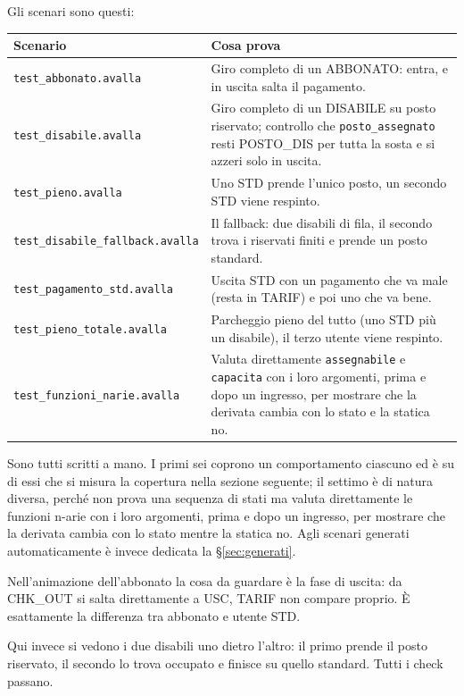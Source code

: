 Gli scenari sono questi:

\begin{longtable}{@{}p{6cm}p{8.8cm}@{}}
\toprule
\textbf{Scenario} & \textbf{Cosa prova} \\
\midrule
\endhead
\texttt{test\_abbonato.avalla} & Giro completo di un ABBONATO: entra, e in uscita salta il pagamento. \\
\texttt{test\_disabile.avalla} & Giro completo di un DISABILE su posto riservato; controllo che \texttt{posto\_assegnato} resti POSTO\_DIS per tutta la sosta e si azzeri solo in uscita. \\
\texttt{test\_pieno.avalla} & Uno STD prende l'unico posto, un secondo STD viene respinto. \\
\texttt{test\_disabile\_fallback.avalla} & Il fallback: due disabili di fila, il secondo trova i riservati finiti e prende un posto standard. \\
\texttt{test\_pagamento\_std.avalla} & Uscita STD con un pagamento che va male (resta in TARIF) e poi uno che va bene. \\
\texttt{test\_pieno\_totale.avalla} & Parcheggio pieno del tutto (uno STD più un disabile), il terzo utente viene respinto. \\
\texttt{test\_funzioni\_narie.avalla} & Valuta direttamente \texttt{assegnabile} e \texttt{capacita} con i loro argomenti, prima e dopo un ingresso, per mostrare che la derivata cambia con lo stato e la statica no. \\
\bottomrule
\end{longtable}

Sono tutti scritti a mano. I primi sei coprono un comportamento ciascuno ed è su di essi
che si misura la copertura nella sezione seguente; il settimo è di natura diversa, perché
non prova una sequenza di stati ma valuta direttamente le funzioni n-arie con i loro
argomenti, prima e dopo un ingresso, per mostrare che la derivata cambia con lo stato
mentre la statica no. Agli scenari generati automaticamente è invece dedicata la
\S\ref{sec:generati}.

Nell'animazione dell'abbonato la cosa da guardare è la fase di uscita: da CHK\_OUT si
salta direttamente a USC, TARIF non compare proprio. È esattamente la differenza tra
abbonato e utente STD.


Qui invece si vedono i due disabili uno dietro l'altro: il primo prende il posto
riservato, il secondo lo trova occupato e finisce su quello standard. Tutti i check
passano.

